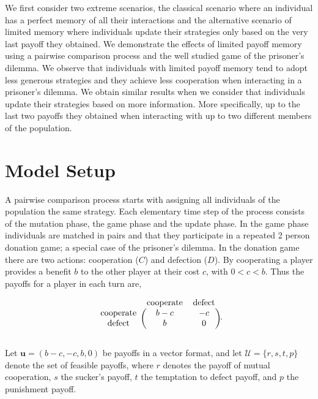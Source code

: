 \documentclass[11pt]{article}
\theoremstyle{plainCl1}
\theoremstyle{plainCl2}
\begin{document}
We first consider two extreme scenarios, the classical scenario where an individual
has a perfect memory of all their interactions and the alternative scenario of
limited memory where individuals update their strategies only based on the very
last payoff they obtained. We demonstrate the effects of limited payoff
memory using a pairwise comparison process and the well studied game of the
prisoner's dilemma. We observe that individuals with limited payoff memory tend to
adopt less generous strategies and they achieve less cooperation when
interacting in a prisoner's dilemma. We obtain similar results when we consider
that individuals update their strategies based on more information. More
specifically, up to the last two payoffs they obtained when interacting with up
to two different members of the population.

\section{Model Setup}\label{section:model}

A pairwise comparison process starts with assigning all
individuals of the population the same strategy. Each elementary time step of
the process consists of the mutation phase, the game phase and the update phase.
In the game phase individuals are matched in pairs and that they participate in
a repeated 2 person donation game; a special case of the prisoner's dilemma. In
the donation game there are two actions: cooperation (\(C\)) and defection
(\(D\)). By cooperating a player provides a benefit \(b\) to the other player at
their cost \(c\), with \(0 < c < b\). Thus the payoffs for a player in each turn
are,

\begin{equation}
    \begin{blockarray}{ccc}
        & \text{cooperate} & \text{defect} \\
        \begin{block}{c(cc)}
            \text{cooperate} & b - c & -c \\
            \text{defect} & b & 0 \\
        \end{block}
    \end{blockarray}.
\end{equation}

Let \(\mathbf{u} = (b-c, -c, b, 0)\) be payoffs in a vector format, and let
\(\mathcal{U} = \{r, s, t, p\}\) denote the set of feasible payoffs, where \(r\)
denotes the payoff of mutual cooperation, \(s\) the sucker's payoff, \(t\) the
temptation to defect payoff, and \(p\) the punishment payoff.
\end{document}
